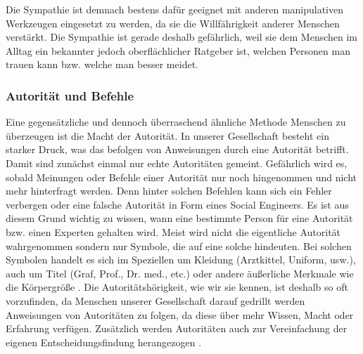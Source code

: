 Die Sympathie ist demnach bestens dafür geeignet mit anderen manipulativen Werkzeugen eingesetzt zu werden, da sie die Willfährigkeit anderer Menschen verstärkt. Die Sympathie ist gerade deshalb gefährlich, weil sie dem Menschen im Alltag ein bekannter jedoch oberflächlicher Ratgeber ist, welchen Personen man trauen kann bzw. welche man besser meidet.

\subsubsection{Autorität und Befehle}\label{sec:autorität-und-befehle}
Eine gegensätzliche und dennoch überraschend ähnliche Methode Menschen zu überzeugen ist die Macht der Autorität.
In unserer Gesellschaft besteht ein starker Druck, was das befolgen von Anweisungen durch eine Autorität betrifft.
Damit sind zunächst einmal nur echte Autoritäten gemeint.
Gefährlich wird es, sobald Meinungen oder Befehle einer Autorität nur noch hingenommen und nicht mehr hinterfragt werden.
Denn hinter solchen Befehlen kann sich ein Fehler verbergen oder eine falsche Autorität in Form eines Social Engineers.
Es ist aus diesem Grund wichtig zu wissen, wann eine bestimmte Person für eine Autorität bzw. einen Experten gehalten wird. Meist wird nicht die eigentliche Autorität wahrgenommen sondern nur Symbole, die auf eine solche hindeuten. Bei solchen Symbolen handelt es sich im Speziellen um Kleidung (Arztkittel, Uniform, usw.), auch um Titel (Graf, Prof., Dr. med., etc.) oder andere äußerliche Merkmale wie die Körpergröße  \citep{cialdini}.
Die Autoritätshörigkeit, wie wir sie kennen, ist deshalb so oft vorzufinden, da Menschen unserer Gesellschaft darauf gedrillt werden Anweisungen von Autoritäten zu folgen, da diese über mehr Wissen, Macht oder Erfahrung verfügen. Zusätzlich werden Autoritäten auch zur Vereinfachung der eigenen Entscheidungsfindung herangezogen \citep{hacking-the-human}.